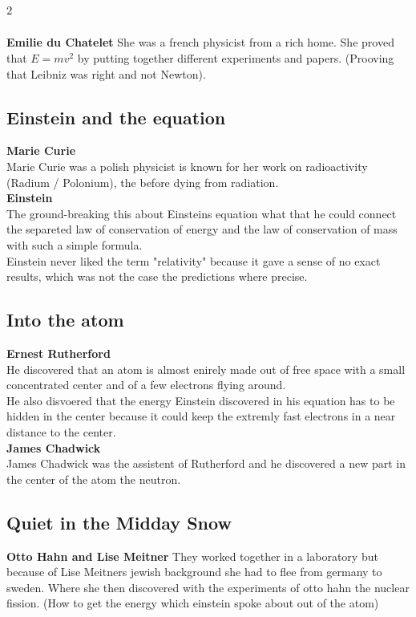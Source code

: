 \documentclass{article}
\begin{document}
\subsection{$^2$}
\textbf{Emilie du Chatelet}
She was a french physicist from a rich home. She proved that $E = mv^2$ by putting together different experiments and papers. (Prooving that Leibniz was right and not Newton).
\subsection{Einstein and the equation}
\textbf{Marie Curie}\\
Marie Curie was a polish physicist is known for her work on radioactivity (Radium / Polonium), the  before dying from radiation. \\
\textbf{Einstein}\\
The ground-breaking this about Einsteins equation what that he could connect the separeted law of conservation of energy and the law of conservation of mass with such a simple formula.\\
Einstein never liked the term "relativity" because it gave a sense of no exact results, which was not the case the predictions where precise. 
\subsection{Into the atom}
\textbf{Ernest Rutherford}\\
He discovered that an atom is almost enirely made out of free space with a small concentrated center and of a few electrons flying around.\\
He also disvoered that the energy Einstein discovered in his equation has to be hidden in the center because it could keep the extremly fast electrons in a near distance to the center.\\
\textbf{James Chadwick}\\
James Chadwick was the assistent of Rutherford and he discovered a new part in the center of the atom the neutron.
\subsection{Quiet in the Midday Snow}
\textbf{Otto Hahn and Lise Meitner}
They worked together in a laboratory but because of Lise Meitners jewish background she had to flee from germany to sweden. Where she then discovered with the experiments of otto hahn the nuclear fission. (How to get the energy which einstein spoke about out of the atom)
\end{document}
